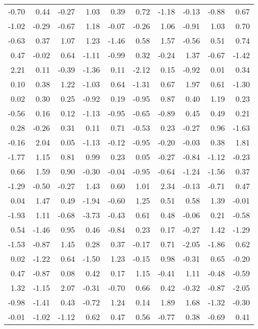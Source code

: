 \documentclass{article}\usepackage[]{graphicx}\usepackage[]{color}
\begin{document}
\begin{longtable}{rrrrrrrrrr}
  -0.70 & 0.44 & -0.27 & 1.03 & 0.39 & 0.72 & -1.18 & -0.13 & -0.88 & 0.67 \\ 
  -1.02 & -0.29 & -0.67 & 1.18 & -0.07 & -0.26 & 1.06 & -0.91 & 1.03 & 0.70 \\ 
  -0.63 & 0.37 & 1.07 & 1.23 & -1.46 & 0.58 & 1.57 & -0.56 & 0.51 & 0.74 \\ 
  0.47 & -0.02 & 0.64 & -1.11 & -0.99 & 0.32 & -0.24 & 1.37 & -0.67 & -1.42 \\ 
  2.21 & 0.11 & -0.39 & -1.36 & 0.11 & -2.12 & 0.15 & -0.92 & 0.01 & 0.34 \\ 
  0.10 & 0.38 & 1.22 & -1.03 & 0.64 & -1.31 & 0.67 & 1.97 & 0.61 & -1.30 \\ 
  0.02 & 0.30 & 0.25 & -0.92 & 0.19 & -0.95 & 0.87 & 0.40 & 1.19 & 0.23 \\ 
  -0.56 & 0.16 & 0.12 & -1.13 & -0.95 & -0.65 & -0.89 & 0.45 & 0.49 & 0.21 \\ 
  0.28 & -0.26 & 0.31 & 0.11 & 0.71 & -0.53 & 0.23 & -0.27 & 0.96 & -1.63 \\ 
  -0.16 & 2.04 & 0.05 & -1.13 & -0.12 & -0.95 & -0.20 & -0.03 & 0.38 & 1.81 \\ 
  -1.77 & 1.15 & 0.81 & 0.99 & 0.23 & 0.05 & -0.27 & -0.84 & -1.12 & -0.23 \\ 
  0.66 & 1.59 & 0.90 & -0.30 & -0.04 & -0.95 & -0.64 & -1.24 & -1.56 & 0.37 \\ 
  -1.29 & -0.50 & -0.27 & 1.43 & 0.60 & 1.01 & 2.34 & -0.13 & -0.71 & 0.47 \\ 
  0.04 & 1.47 & 0.49 & -1.94 & -0.60 & 1.25 & 0.51 & 0.58 & 1.39 & -0.01 \\ 
  -1.93 & 1.11 & -0.68 & -3.73 & -0.43 & 0.61 & 0.48 & -0.06 & 0.21 & -0.58 \\ 
  0.54 & -1.46 & 0.95 & 0.46 & -0.84 & 0.23 & 0.17 & -0.27 & 1.42 & -1.29 \\ 
  -1.53 & -0.87 & 1.45 & 0.28 & 0.37 & -0.17 & 0.71 & -2.05 & -1.86 & 0.62 \\ 
  0.02 & -1.22 & 0.64 & -1.50 & 1.23 & -0.15 & 0.98 & -0.31 & 0.65 & -0.20 \\ 
  0.47 & -0.87 & 0.08 & 0.42 & 0.17 & 1.15 & -0.41 & 1.11 & -0.48 & -0.59 \\ 
  1.32 & -1.15 & 2.07 & -0.31 & -0.70 & 0.66 & 0.42 & -0.32 & -0.87 & -2.05 \\ 
  -0.98 & -1.41 & 0.43 & -0.72 & 1.24 & 0.14 & 1.89 & 1.68 & -1.32 & -0.30 \\ 
  -0.01 & -1.02 & -1.12 & 0.62 & 0.47 & 0.56 & -0.77 & 0.38 & -0.69 & 0.41 \\ 

\end{longtable}
\end{document}
